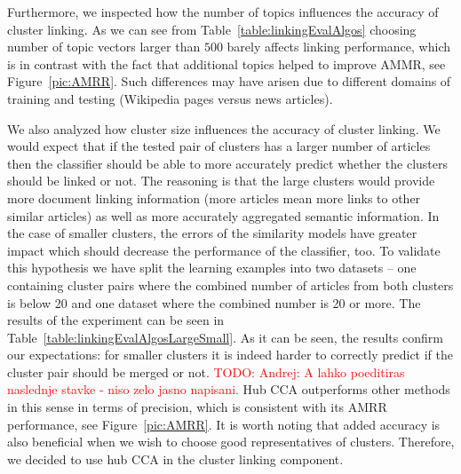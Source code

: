 \documentclass[twoside,11pt]{article}
\newcommand{\todo}[1]{\textcolor{red}{TODO: #1}}
\newcommand{\oldText}[1]{\textcolor{red}{#1:}\color{blue}}
\begin{document}
Furthermore, we inspected how the number of topics influences the accuracy of cluster linking. As we can see from Table~\ref{table:linkingEvalAlgos} choosing number of topic vectors larger than $500$ barely affects linking performance, which is in contrast with the fact that additional topics helped to improve AMMR, see Figure~\ref{pic:AMRR}. Such differences may have arisen due to different domains of training and testing (Wikipedia pages versus news articles).

We also analyzed how cluster size influences the accuracy of cluster linking. We would expect that if the tested pair of clusters has a larger number of articles then the classifier should be able to more accurately predict whether the clusters should be linked or not. The reasoning is that the large clusters would provide more document linking information (more articles mean more links to other similar articles) as well as more accurately aggregated semantic information. In the case of smaller clusters, the errors of the similarity models have greater impact which should decrease the performance of the classifier, too. To validate this hypothesis we have split the learning examples into two datasets -- one containing cluster pairs where the combined number of articles from both clusters is below 20 and one dataset where the combined number is 20 or more. The results of the experiment can be seen in Table~\ref{table:linkingEvalAlgosLargeSmall}. As it can be seen, the results confirm our expectations: for smaller clusters it is indeed harder to correctly predict if the cluster pair should be merged or not. \todo{Andrej: A lahko poeditiras naslednje stavke - niso zelo jasno napisani.} Hub CCA outperforms other methods in this sense in terms of precision, which is consistent with its AMRR performance, see Figure~\ref{pic:AMRR}.
It is worth noting that added accuracy is also beneficial when we wish to choose good representatives of clusters. Therefore, we decided to use hub CCA in the cluster linking component.

\end{document}
